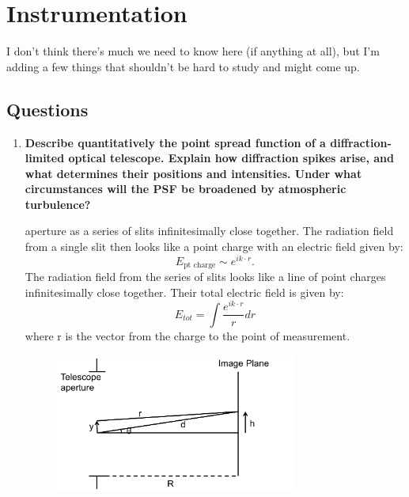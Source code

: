 \section{Instrumentation}
I don't think there's much we need to know here (if anything at all), 
but I'm adding a few things that shouldn't be hard to study and might come up.  

\subsection{Questions}
\begin{enumerate}
\item \textbf{Describe quantitatively the point spread function of a diffraction-limited optical
      telescope. Explain how diffraction spikes arise, and what determines their positions
      and intensities. Under what circumstances will the PSF be broadened by atmospheric
      turbulence?}
      
       aperture as a series of slits infinitesimally close together. The radiation field from a single slit then looks like a point charge with an electric field given by:
      \begin{equation}
      E_{\mbox{pt charge}} \sim e^{ik \cdot r}.
      \end{equation}
      The radiation field from the series of slits looks like a line of point charges infinitesimally close together. Their total electric field is given by:
      \begin{equation}
      E_{tot} = \int \frac{e^{ik \cdot r}}{r}dr
      \label{eqn:efield}
      \end{equation}
      where r is the vector from the charge to the point of measurement. 
      
      \begin{figure}[h]
      \centering
      \includegraphics[width=0.75\textwidth]{fourier_layout.png}
      \label{fig:optics}
      \end{figure}
      

\end{enumerate}
